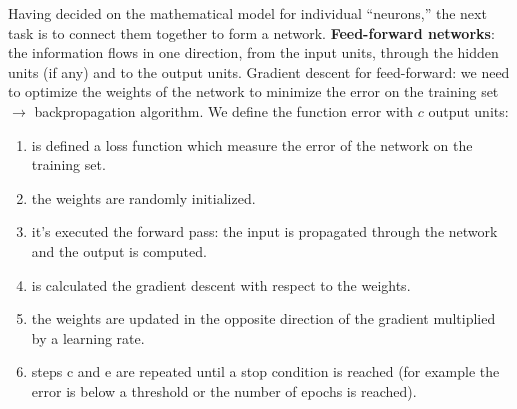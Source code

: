 \documentclass[12pt]{article}
\begin{document}
\begin{enumerate}[label=\textbf{ML.\arabic*}]
    Having decided on the mathematical model for individual “neurons,”  the next task is to connect them together to form a network.
    \textbf{Feed-forward networks}: the information flows in one direction, from the input units, through the hidden units (if any) and to the output units.
    Gradient descent for feed-forward: we need to optimize the weights of the network to minimize the error on the training set $\rightarrow$ backpropagation algorithm.
    We define the function error with $c$ output units:
    \begin{enumerate}
        \item is defined a loss function which measure the error of the network on the training set.
        \item the weights are randomly initialized.
        \item it's executed the forward pass: the input is propagated through the network and the output is computed.
        \item is calculated the gradient descent with respect to the weights.
        \item the weights are updated in the opposite direction of the gradient multiplied by a learning rate.
        \item steps c and e are repeated until a stop condition is reached (for example the error is below a threshold or the number of epochs is reached).
    \end{enumerate}


\end{enumerate}
\end{document}
